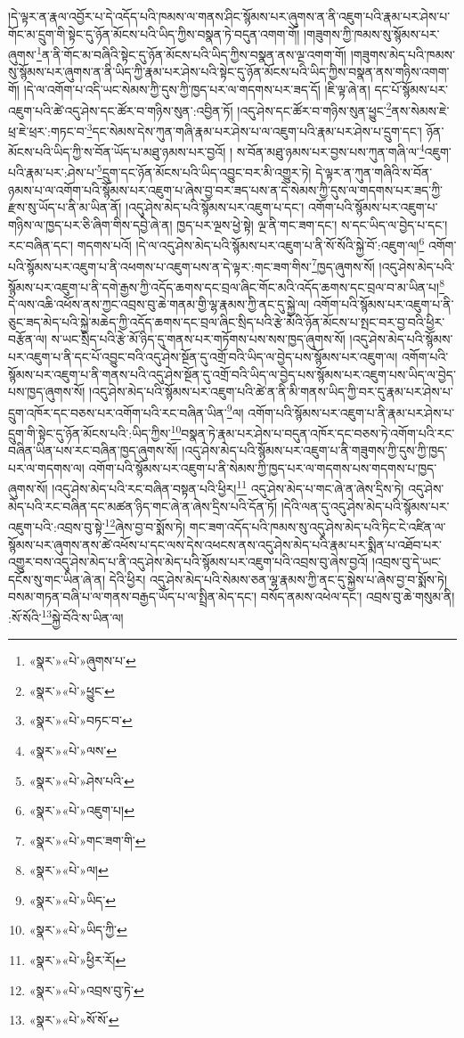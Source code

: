 །དེ་ལྟར་ན་རྣལ་འབྱོར་པ་དེ་འདོད་པའི་ཁམས་ལ་གནས་ཤིང་སྙོམས་པར་ཞུགས་ན་ནི་འཇུག་པའི་རྣམ་པར་ཤེས་པ་གོང་མ་དྲུག་གི་སྟེང་དུ་ཉོན་མོངས་པའི་ཡིད་ཀྱིས་བསྣན་ཏེ་བདུན་འགག་གོ། །གཟུགས་ཀྱི་ཁམས་སུ་སྙོམས་པར་ཞུགས་\footnote{«སྣར་»«པེ་»ཞུགས་པ་}ན་ནི་གོང་མ་བཞིའི་སྟེང་དུ་ཉོན་མོངས་པའི་ཡིད་ཀྱིས་བསྣན་ནས་ལྔ་འགག་གོ། །གཟུགས་མེད་པའི་ཁམས་སུ་སྙོམས་པར་ཞུགས་ན་ནི་ཡིད་ཀྱི་རྣམ་པར་ཤེས་པའི་སྟེང་དུ་ཉོན་མོངས་པའི་ཡིད་ཀྱིས་བསྣན་ནས་གཉིས་འགག་གོ། །དེ་ལ་འགོག་པ་འདི་ཡང་སེམས་ཀྱི་དུས་ཀྱི་ཁྱད་པར་ལ་གདགས་པར་ཟད་དོ། །ཇི་ལྟ་ཞེ་ན། དང་པོ་སྙོམས་པར་འཇུག་པའི་ཚེ་འདུ་ཤེས་དང་ཚོར་བ་གཉིས་སུན་:འབྱིན་ཏོ། །འདུ་ཤེས་དང་ཚོར་བ་གཉིས་སུན་ཕྱུང་\footnote{«སྣར་»«པེ་»ཕྱུང་}ནས་སེམས་ཇེ་ཕྲ་ཇེ་ཕྲར་:གཏང་བ་\footnote{«སྣར་»«པེ་»བཏང་བ་}དང་སེམས་དེས་ཀུན་གཞི་རྣམ་པར་ཤེས་པ་ལ་འཇུག་པའི་རྣམ་པར་ཤེས་པ་དྲུག་དང་། ཉོན་མོངས་པའི་ཡིད་ཀྱི་ས་བོན་ཡོད་པ་མཐུ་ཉམས་པར་བྱའོ། །
ས་བོན་མཐུ་ཉམས་པར་བྱས་པས་ཀུན་གཞི་ལ་\footnote{«སྣར་»«པེ་»ལས་}འཇུག་པའི་རྣམ་པར་:ཤེས་པ་\footnote{«སྣར་»«པེ་»ཤེས་པའི་}དྲུག་དང་ཉོན་མོངས་པའི་ཡིད་འབྱུང་བར་མི་འགྱུར་ཏེ། དེ་ལྟར་ན་ཀུན་གཞིའི་ས་བོན་ཉམས་པ་ལ་འགོག་པའི་སྙོམས་པར་འཇུག་པ་ཞེས་བྱ་བར་ཟད་པས་ན་དེ་སེམས་ཀྱི་དུས་ལ་གདགས་པར་ཟད་ཀྱི་རྫས་སུ་ཡོད་པ་ནི་མ་ཡིན་ནོ། །འདུ་ཤེས་མེད་པའི་སྙོམས་པར་འཇུག་པ་དང་། འགོག་པའི་སྙོམས་པར་འཇུག་པ་གཉིས་ལ་ཁྱད་པར་ཅི་ཞིག་གིས་དབྱེ་ཞེ་ན། ཁྱད་པར་ལྔས་ཕྱེ་སྟེ། ལྔ་ནི་གང་ཟག་དང་། ས་དང་ཡིད་ལ་བྱེད་པ་དང་། རང་བཞིན་དང་། གདགས་པའོ། །དེ་ལ་འདུ་ཤེས་མེད་པའི་སྙོམས་པར་འཇུག་པ་ནི་སོ་སོའི་སྐྱེ་བོ་:འཇུག་ལ།\footnote{«སྣར་»«པེ་»འཇུག་པ།} འགོག་པའི་སྙོམས་པར་འཇུག་པ་ནི་འཕགས་པ་འཇུག་པས་ན་དེ་ལྟར་:གང་ཟག་གིས་\footnote{«སྣར་»«པེ་»གང་ཟག་གི་}ཁྱད་ཞུགས་སོ། །འདུ་ཤེས་མེད་པའི་སྙོམས་པར་འཇུག་པ་ནི་དགེ་རྒྱས་ཀྱི་འདོད་ཆགས་དང་བྲལ་ཞིང་གོང་མའི་འདོད་ཆགས་དང་བྲལ་བ་མ་ཡིན་པ།\footnote{«སྣར་»«པེ་»ལ།} དེ་ལས་འཆི་འཕོས་ནས་ཀྱང་འབྲས་བུ་ཆེ་གནམ་གྱི་ལྷ་རྣམས་ཀྱི་ནང་དུ་སྐྱེ་ལ། འགོག་པའི་སྙོམས་པར་འཇུག་པ་ནི་ཅུང་ཟད་མེད་པའི་སྐྱེ་མཆེད་ཀྱི་འདོད་ཆགས་དང་བྲལ་ཞིང་སྲིད་པའི་རྩེ་མོའི་ཉོན་མོངས་པ་སྤང་བར་བྱ་བའི་ཕྱིར་བརྩོན་ལ། ས་ཡང་སྲིད་པའི་རྩེ་མོ་ཉིད་དུ་གནས་པར་གཏོགས་པས་སས་ཁྱད་ཞུགས་སོ། །འདུ་ཤེས་མེད་པའི་སྙོམས་པར་འཇུག་པ་ནི་དང་པོ་འབྱུང་བའི་འདུ་ཤེས་སྔོན་དུ་འགྲོ་བའི་ཡིད་ལ་བྱེད་པས་སྙོམས་པར་འཇུག་ལ། འགོག་པའི་སྙོམས་པར་འཇུག་པ་ནི་གནས་པའི་འདུ་ཤེས་སྔོན་དུ་འགྲོ་བའི་ཡིད་ལ་བྱེད་པས་སྙོམས་པར་འཇུག་པས་ཡིད་ལ་བྱེད་པས་ཁྱད་ཞུགས་སོ། །འདུ་ཤེས་མེད་པའི་སྙོམས་པར་འཇུག་པའི་ཚེ་ན་ནི་མི་གནས་ཡིད་ཀྱི་བར་དུ་རྣམ་པར་ཤེས་པ་དྲུག་འཁོར་དང་བཅས་པར་འགོག་པའི་རང་བཞིན་ཡིན་\footnote{«སྣར་»«པེ་»ཡིད་}ལ། འགོག་པའི་སྙོམས་པར་འཇུག་པ་ནི་རྣམ་པར་ཤེས་པ་དྲུག་གི་སྟེང་དུ་ཉོན་མོངས་པའི་:ཡིད་ཀྱིས་\footnote{«སྣར་»«པེ་»ཡིད་ཀྱི་}བསྣན་ཏེ་རྣམ་པར་ཤེས་པ་བདུན་འཁོར་དང་བཅས་ཏེ་འགོག་པའི་རང་བཞིན་ཡིན་པས་རང་བཞིན་ཁྱད་ཞུགས་སོ། །འདུ་ཤེས་མེད་པའི་སྙོམས་པར་འཇུག་པ་ནི་གཟུགས་ཀྱི་དུས་ཀྱི་ཁྱད་པར་ལ་གདགས་ལ། འགོག་པའི་སྙོམས་པར་འཇུག་པ་ནི་སེམས་ཀྱི་ཁྱད་པར་ལ་གདགས་པས་གདགས་པ་ཁྱད་ཞུགས་སོ། །འདུ་ཤེས་མེད་པའི་རང་བཞིན་བསྟན་པའི་ཕྱིར།\footnote{«སྣར་»«པེ་»ཕྱིར་རོ།} འདུ་ཤེས་མེད་པ་གང་ཞེ་ན་ཞེས་དྲིས་ཏེ། འདུ་ཤེས་མེད་པའི་རང་བཞིན་དང་མཚན་ཉིད་གང་ཞེ་ན་ཞེས་དྲིས་པའི་དོན་ཏོ། །དེའི་ལན་དུ་འདུ་ཤེས་མེད་པའི་སྙོམས་པར་འཇུག་པའི་:འབྲས་བུ་སྟེ་\footnote{«སྣར་»«པེ་»འབྲས་བུ་ཏེ་}ཞེས་བྱ་བ་སྨོས་ཏེ། གང་ཟག་འདོད་པའི་ཁམས་སུ་འདུ་ཤེས་མེད་པའི་ཏིང་ངེ་འཛིན་ལ་སྙོམས་པར་ཞུགས་ནས་ཚེ་འཕོས་པ་དང་ལས་དེས་འཕངས་ནས་འདུ་ཤེས་མེད་པའི་རྣམ་པར་སྨིན་པ་འཐོབ་པར་འགྱུར་བས་འདུ་ཤེས་མེད་པ་ནི་འདུ་ཤེས་མེད་པའི་སྙོམས་པར་འཇུག་པའི་འབྲས་བུ་ཞེས་བྱའོ། །འབྲས་བུ་དེ་ཡང་དངོས་སུ་གང་ཡིན་ཞེ་ན། དེའི་ཕྱིར། འདུ་ཤེས་མེད་པའི་སེམས་ཅན་ལྷ་རྣམས་ཀྱི་ནང་དུ་སྐྱེས་པ་ཞེས་བྱ་བ་སྨོས་ཏེ། བསམ་གཏན་བཞི་པ་ལ་གནས་བརྒྱད་ཡོད་པ་ལ་སྤྲིན་མེད་དང་། བསོད་ནམས་འཕེལ་དང་། འབྲས་བུ་ཆེ་གསུམ་ནི། :སོ་སོའི་\footnote{«སྣར་»«པེ་»སོ་སོ་}སྐྱེ་བོའི་ས་ཡིན་ལ། 